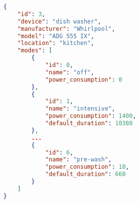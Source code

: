 \begin{lstlisting}[language=json,caption={JSON file describing the dish washer.},label=code:appliance_dish_washer,float,floatplacement=H]
{
	"id": 3,
	"device": "dish washer",
	"manufacturer": "Whirlpool",
	"model": "ADG 555 IX",
	"location": "kitchen",
	"modes": [
		{
			"id": 0,
			"name": "off",
			"power_consumption": 0
		},
		{
			"id": 1,
			"name": "intensive",
			"power_consumption": 1400,
			"default_duration": 10380
		},
		...	
		{
			"id": 6,
			"name": "pre-wash",
			"power_consumption": 10,
			"default_duration": 660
		}
	]
}
\end{lstlisting}